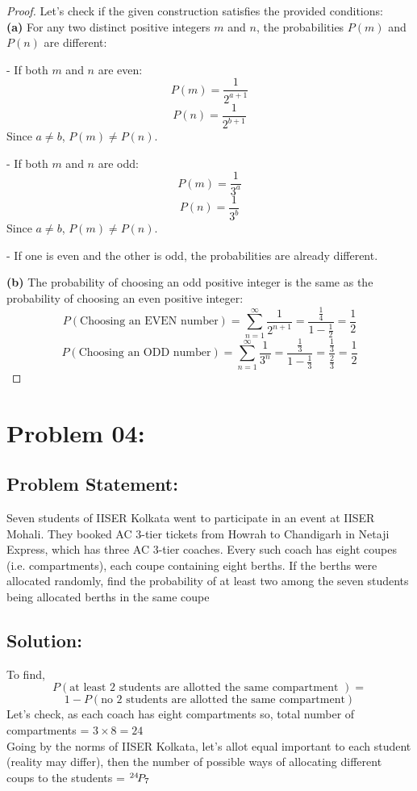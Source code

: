 \documentclass{article}
\newcommand*{\permcomb}[4][0mu]{{{}^{#3}\mkern#1#2_{#4}}}
\newcommand*{\perm}[1][-3mu]{\permcomb[#1]{P}}
\theoremstyle{definition}
\begin{document}
\begin{proof}
    Let's check if the given construction satisfies the provided conditions:
    \\
\textbf{(a)} For any two distinct positive integers \(m\) and \(n\), the probabilities \(P(m)\) and \(P(n)\) are different:

- If both \(m\) and \(n\) are even:
  $$ P(m) = \frac{1}{2^{a+1}} $$
  $$ P(n) = \frac{1}{2^{b+1}} $$
  Since \(a \neq b\), \(P(m) \neq P(n)\).

- If both \(m\) and \(n\) are odd:
  $$ P(m) = \frac{1}{3^a} $$
  $$ P(n) = \frac{1}{3^b} $$
  Since \(a \neq b\), \(P(m) \neq P(n)\).

- If one is even and the other is odd, the probabilities are already different.

\textbf{(b)} The probability of choosing an odd positive integer is the same as the probability of choosing an even positive integer:\\

    \[
    P(\text{Choosing an EVEN number}) = \sum_{n=1}^{\infty} \frac{1}{2^{n+1}} = \frac{\frac{1}{4}}{1 - \frac{1}{2}} = \frac{1}{2}
    \]
    \[
P(\text{Choosing an ODD number}) = \sum_{n=1}^{\infty} \frac{1}{3^{n}} = \frac{\frac{1}{3}}{1 - \frac{1}{3}} = \frac{\frac{1}{3}}{\frac{2}{3}} =\frac{1}{2}
\]








\end{proof}

\section{Problem 04:}
\begin{mdframed}[style = MyFrame]
    \subsection{Problem Statement:}
    Seven students of IISER Kolkata went to participate in an event at IISER Mohali. They booked AC 3-tier tickets from Howrah to 
 Chandigarh in Netaji Express, which has three AC 3-tier
coaches. Every such coach has eight coupes (i.e. compartments), each coupe containing eight
berths. If the berths were allocated randomly, find the probability of at least two among the
seven students being allocated berths in the same coupe
\end{mdframed}
\subsection{Solution:}
To find, \\
\[
P(\text{at least 2 students  are allotted the same compartment }) = \]
\[1 - P(\text{no 2 students  are allotted the same compartment})
\]
Let's check, as each coach has eight compartments so, total number of compartments = $3 \times 8 = 24$
\\
Going by the norms of IISER Kolkata, let's allot equal important to each student (reality may differ), then the number of possible ways of allocating different coups to the students = $\perm{24}{7}$\\
\end{document}
